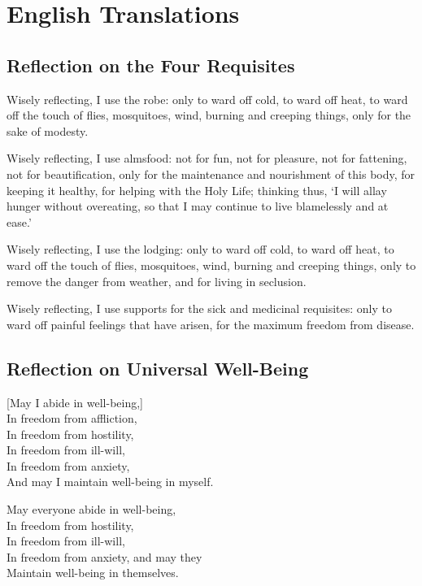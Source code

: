 \chapter{English Translations}

\section{Reflection on the Four Requisites}

Wisely reflecting, I use the robe: only to ward off cold, to ward off heat, to ward off the touch of flies, mosquitoes, wind, burning and creeping things, only for the sake of modesty.

Wisely reflecting, I use almsfood: not for fun, not for pleasure, not for fattening, not for beautification, only for the maintenance and nourishment of this body, for keeping it healthy, for helping with the Holy Life; thinking thus, `I will allay hunger without overeating, so that I may continue to live blamelessly and at ease.'

Wisely reflecting, I use the lodging: only to ward off cold, to ward off heat, to ward off the touch of flies, mosquitoes, wind, burning and creeping things, only to remove the danger from weather, and for living in seclusion.

Wisely reflecting, I use supports for the sick and medicinal requisites: only to ward off painful feelings that have arisen, for the maximum freedom from disease.


\section{Reflection on Universal Well-Being}

\begin{leader}
\end{leader}

[May I abide in well-being,]\\
In freedom from affliction,\\
In freedom from hostility,\\
In freedom from ill-will,\\
In freedom from anxiety,\\
And may I maintain well-being in myself.

May everyone abide in well-being,\\
In freedom from hostility,\\
In freedom from ill-will,\\
In freedom from anxiety, and may they\\
Maintain well-being in themselves.

